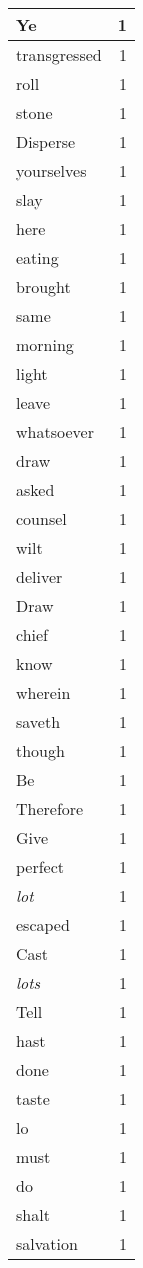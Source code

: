 \begin{center}
\begin{longtable}{l|r}
Ye & 1 \\ \hline
transgressed & 1 \\ \hline
roll & 1 \\ \hline
stone & 1 \\ \hline
Disperse & 1 \\ \hline
yourselves & 1 \\ \hline
slay & 1 \\ \hline
here & 1 \\ \hline
eating & 1 \\ \hline
brought & 1 \\ \hline
same & 1 \\ \hline
morning & 1 \\ \hline
light & 1 \\ \hline
leave & 1 \\ \hline
whatsoever & 1 \\ \hline
draw & 1 \\ \hline
asked & 1 \\ \hline
counsel & 1 \\ \hline
wilt & 1 \\ \hline
deliver & 1 \\ \hline
Draw & 1 \\ \hline
chief & 1 \\ \hline
know & 1 \\ \hline
wherein & 1 \\ \hline
saveth & 1 \\ \hline
though & 1 \\ \hline
Be & 1 \\ \hline
Therefore & 1 \\ \hline
Give & 1 \\ \hline
perfect & 1 \\ \hline
\emph{lot} & 1 \\ \hline
escaped & 1 \\ \hline
Cast & 1 \\ \hline
\emph{lots} & 1 \\ \hline
Tell & 1 \\ \hline
hast & 1 \\ \hline
done & 1 \\ \hline
taste & 1 \\ \hline
lo & 1 \\ \hline
must & 1 \\ \hline
do & 1 \\ \hline
shalt & 1 \\ \hline
salvation & 1 \\ \hline

\end{longtable}
\end{center}
